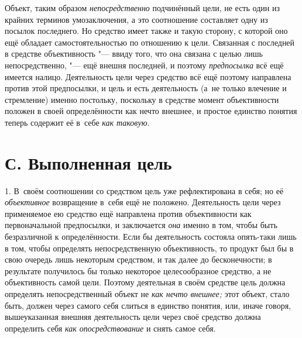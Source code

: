 Объект, таким образом
{\em непосредственно}
подчинённый цели, не есть один из крайних терминов
умозаключения, а это соотношение составляет одну из посылок последнего. Но
средство имеет также и такую сторону, с которой оно ещё обладает
самостоятельностью по отношению к цели. Связанная с последней в средстве
объективность "--- ввиду того, что она связана с целью лишь
непосредственно, "--- ещё внешня последней, и поэтому
{\em предпосылка} всё ещё
имеется налицо. Деятельность цели через средство всё ещё поэтому направлена
против этой предпосылки, и цель и есть деятельность (а~не только влечение и
стремление) именно постольку, поскольку в средстве момент объективности
положен в своей определённости как нечто внешнее, и простое единство
понятия теперь содержит её в~себе
{\em как таковую}.

\section[С. Выполненная цель]{С. Выполненная цель}

1. В~своём соотношении со средством цель уже рефлектирована в
себя; но её {\em объективное}
возвращение в~себя ещё не положено. Деятельность цели через
применяемое ею средство ещё направлена против объективности как
первоначальной предпосылки, и заключается
{\em она} именно в том,
чтобы быть безразличной к определённости. Если бы деятельность состояла
опять-таки лишь в том, чтобы определять непосредственную объективность, то
продукт был бы в свою очередь лишь некоторым средством, и так далее до
бесконечности; в результате получилось бы только некоторое целесообразное
средство, а не объективность самой цели. Поэтому деятельная в своём
средстве цель должна определять непосредственный объект не
{\em как нечто внешнее;}
этот объект, стало быть, должен через самого себя слиться в
единство понятия, или, иначе говоря, вышеуказанная внешняя деятельность
цели через своё средство должна определить себя
{\em как опосредствование} и снять самое себя.

